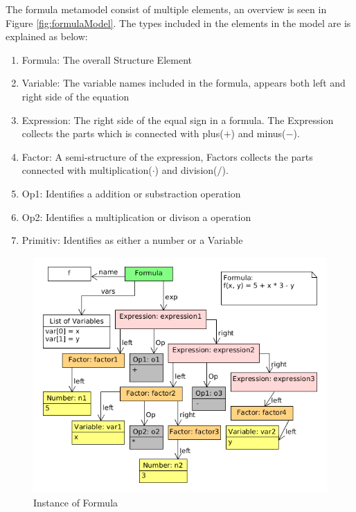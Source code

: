 The formula metamodel consist of multiple elements, an overview is seen in Figure
\ref{fig:formulaModel}. The types included in the elements in the model are is explained as below:
\begin{enumerate}
\item Formula: The overall Structure Element
\item Variable: The variable names included in the formula, appears both left and right side of the equation
\item Expression: The right side of the equal sign in a formula. The Expression collects the parts which is connected with plus($+$) and minus($-$). 
\item Factor: A semi-structure of the expression, Factors collects the parts connected with multiplication($\cdot$) and division($/$).
\item Op1: Identifies a addition or substraction operation
\item Op2: Identifies a multiplication or divison a operation
\item Primitiv: Identifies as either a number or a Variable
\end{enumerate}

\begin{figure}
  \begin{center}
    \includegraphics[width=\linewidth]{images/formulaInstance}
  \end{center}
  \caption{Instance of Formula}
  \label{fig:formulaInstance}
\end{figure}

